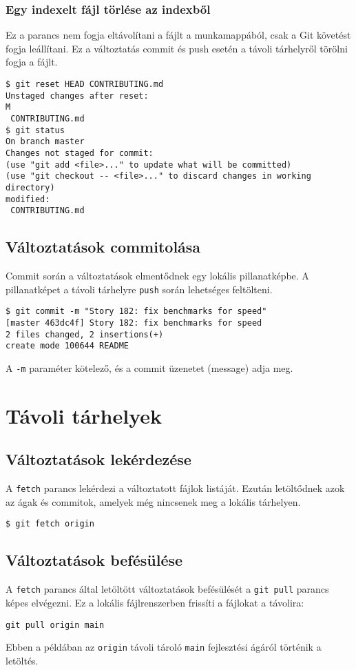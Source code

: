 \documentclass{article}
\begin{document}
\subsubsection*{Egy indexelt fájl törlése az indexből}
Ez a parancs nem fogja eltávolítani a fájlt a munkamappából, csak a Git követést fogja leállítani. Ez a változtatás commit és push esetén a távoli tárhelyről törölni fogja a fájlt.
\begin{lstlisting}
$ git reset HEAD CONTRIBUTING.md
Unstaged changes after reset:
M
 CONTRIBUTING.md
$ git status
On branch master
Changes not staged for commit:
(use "git add <file>..." to update what will be committed)
(use "git checkout -- <file>..." to discard changes in working directory)
modified:
 CONTRIBUTING.md
\end{lstlisting}

\subsection*{Változtatások commitolása}
Commit során a változtatások elmentődnek egy lokális pillanatképbe. A pillanatképet a távoli tárhelyre \texttt{push} során lehetséges feltölteni.
\begin{lstlisting}
$ git commit -m "Story 182: fix benchmarks for speed"
[master 463dc4f] Story 182: fix benchmarks for speed
2 files changed, 2 insertions(+)
create mode 100644 README
\end{lstlisting}
A \texttt{-m} paraméter kötelező, és a commit üzenetet (message) adja meg.

\section{Távoli tárhelyek}
\subsection*{Változtatások lekérdezése}
A \texttt{fetch} parancs lekérdezi a változtatott fájlok listáját. Ezután letöltődnek azok az ágak és commitok, amelyek még nincsenek meg a lokális tárhelyen.
\begin{lstlisting}
$ git fetch origin
\end{lstlisting}

\subsection*{Változtatások befésülése}
A \texttt{fetch} parancs által letöltött változtatások befésülését a \texttt{git pull} parancs képes elvégezni. Ez a lokális fájlrenszerben frissíti a fájlokat a távolira:
\begin{lstlisting}
git pull origin main
\end{lstlisting}
Ebben a példában az \texttt{origin} távoli tároló \texttt{main} fejlesztési ágáról történik a letöltés.
\end{document}
